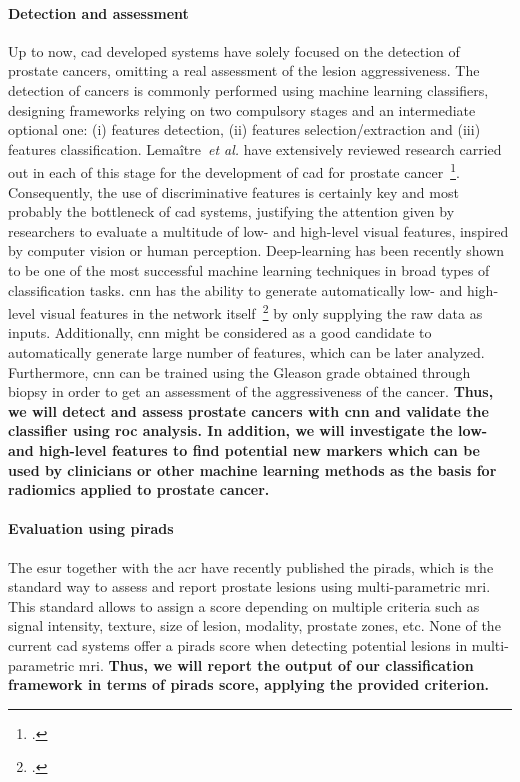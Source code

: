 \paragraph{Detection and assessment}

Up to now, \ac{cad} developed systems have solely focused on the detection of prostate cancers, omitting a real assessment of the lesion aggressiveness.
The detection of cancers is commonly performed using machine learning classifiers, designing frameworks relying on two compulsory stages and an intermediate optional one: (i) features detection, (ii) features selection/extraction and (iii) features classification.
Lema\^itre~\emph{et al.} have extensively reviewed research carried out in each of this stage for the development of \ac{cad} for prostate cancer~\footcite{Lemaitre2015}.
Consequently, the use of discriminative features is certainly key and most probably the bottleneck of \ac{cad} systems, justifying the attention given by researchers to evaluate a multitude of low- and high-level visual features, inspired by computer vision or human perception.
Deep-learning has been recently shown to be one of the most successful machine learning techniques in broad types of classification tasks.
\ac{cnn} has the ability to generate automatically low- and high-level visual features in the network itself~\footcite{Zeiler2013} by only supplying the raw data as inputs.
Additionally, \ac{cnn} might be considered as a good candidate to automatically generate large number of features, which can be later analyzed.
Furthermore, \ac{cnn} can be trained using the Gleason grade obtained through biopsy in order to get an assessment of the aggressiveness of the cancer.
\textbf{Thus, we will detect and assess prostate cancers with \ac{cnn} and validate the classifier using \ac{roc} analysis.
  In addition, we will investigate the low- and high-level features to find potential new markers which can be used by clinicians or other machine learning methods as the basis for radiomics applied to prostate cancer.}

\paragraph{Evaluation using \acs*{pirads}}

The \ac{esur} together with the \ac{acr} have recently published the \ac{pirads}, which is the standard way to assess and report prostate lesions using multi-parametric \ac{mri}.
This standard allows to assign a score depending on multiple criteria such as signal intensity, texture, size of lesion, modality, prostate zones, etc.
None of the current \ac{cad} systems offer a \ac{pirads} score when detecting potential lesions in multi-parametric \ac{mri}.
\textbf{Thus, we will report the output of our classification framework in terms of \ac{pirads} score, applying the provided criterion.}


